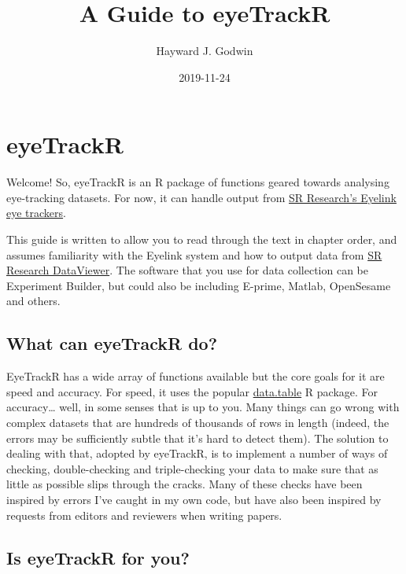 \documentclass[]{book}
\title{A Guide to eyeTrackR}
\author{Hayward J. Godwin}
\date{2019-11-24}
\begin{document}
\maketitle

{
\setcounter{tocdepth}{1}
\tableofcontents
}
\hypertarget{index}{%
\chapter{eyeTrackR}\label{index}}

Welcome! So, eyeTrackR is an R package of functions geared towards analysing eye-tracking datasets. For now, it can handle output from \href{https://www.sr-research.com/}{SR Research's Eyelink eye trackers}.

This guide is written to allow you to read through the text in chapter order, and assumes familiarity with the Eyelink system and how to output data from \href{https://www.sr-research.com/data-viewer/}{SR Research DataViewer}. The software that you use for data collection can be Experiment Builder, but could also be including E-prime, Matlab, OpenSesame and others.

\hypertarget{what-can-eyetrackr-do}{%
\section{What can eyeTrackR do?}\label{what-can-eyetrackr-do}}

EyeTrackR has a wide array of functions available but the core goals for it are speed and accuracy. For speed, it uses the popular \href{https://cran.r-project.org/web/packages/data.table/vignettes/datatable-intro.html}{data.table} R package. For accuracy\ldots{} well, in some senses that is up to you. Many things can go wrong with complex datasets that are hundreds of thousands of rows in length (indeed, the errors may be sufficiently subtle that it's hard to detect them). The solution to dealing with that, adopted by eyeTrackR, is to implement a number of ways of checking, double-checking and triple-checking your data to make sure that as little as possible slips through the cracks. Many of these checks have been inspired by errors I've caught in my own code, but have also been inspired by requests from editors and reviewers when writing papers.

\hypertarget{is-eyetrackr-for-you}{%
\section{Is eyeTrackR for you?}\label{is-eyetrackr-for-you}}
\end{document}

